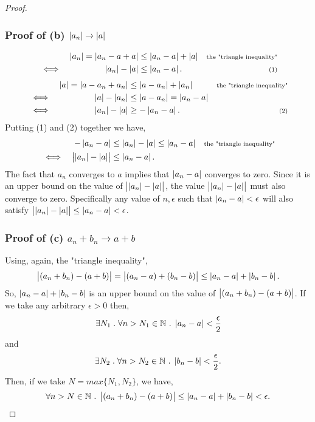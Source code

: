 \documentclass[../MathsNotesBase.tex]{subfiles}
\begin{document}
{\begin{proof}
			\subsubsection{Proof of (b) $ \left\lvert a_n\right\rvert \to \left\lvert a\right\rvert $} 
			\begin{align*}
			&& \left\lvert a_n\right\rvert = \left\lvert a_n - a + a\right\rvert &\leq \left\lvert a_n - a\right\rvert + \left\lvert a\right\rvert  &\text{\scriptsize{the "triangle inequality"}}\\
			&\iff & \left\lvert a_n\right\rvert - \left\lvert a\right\rvert &\leq \left\lvert a_n - a\right\rvert. &\text{\scriptsize{(1)}} \\
			\end{align*}
			\begin{align*}
			&& \left\lvert a\right\rvert = \left\lvert a - a_n + a_n\right\rvert &\leq \left\lvert a - a_n\right\rvert + \left\lvert a_n\right\rvert  &\text{\scriptsize{the "triangle inequality"}}\\
			&\iff & \left\lvert a\right\rvert - \left\lvert a_n\right\rvert &\leq \left\lvert a - a_n\right\rvert = \left\lvert a_n - a\right\rvert &\text{\scriptsize{}} \\
			&\iff & \left\lvert a_n\right\rvert - \left\lvert a\right\rvert &\geq -\left\lvert a_n - a\right\rvert. &\text{\scriptsize{(2)}} \\
			\end{align*}
			Putting (1) and (2) together we have,
			\begin{align*}
			&& -\left\lvert a_n - a\right\rvert &\leq \left\lvert a_n\right\rvert - \left\lvert a\right\rvert \leq \left\lvert a_n - a\right\rvert &\text{\scriptsize{the "triangle inequality"}}\\
			&\iff & \left\lvert\left\lvert a_n\right\rvert - \left\lvert a\right\rvert\right\rvert &\leq \left\lvert a_n - a\right\rvert. \\
			\end{align*}
			The fact that $a_n$ converges to $a$ implies that $ \left\lvert a_n - a\right\rvert $ converges to zero. Since it is an upper bound on the value of ${ \left\lvert\left\lvert a_n\right\rvert - \left\lvert a\right\rvert\right\rvert }$, the value ${ \left\lvert\left\lvert a_n\right\rvert - \left\lvert a\right\rvert\right\rvert }$ must also converge to zero. Specifically any value of $ n, \epsilon $ such that ${ \left\lvert a_n - a\right\rvert < \epsilon }$ will also satisfy ${ \left\lvert\left\lvert a_n\right\rvert - \left\lvert a\right\rvert\right\rvert \leq \left\lvert a_n - a\right\rvert < \epsilon }$.
			
			\subsubsection{Proof of (c) $ a_n + b_n \to a + b $}
			Using, again, the "triangle inequality",
			\[ \left\lvert(a_n + b_n) - (a + b)\right\rvert = \left\lvert(a_n - a) + (b_n - b)\right\rvert \leq \left\lvert a_n - a\right\rvert + \left\lvert b_n - b\right\rvert. \]
			So, ${ \left\lvert a_n - a\right\rvert + \left\lvert b_n - b\right\rvert }$ is an upper bound on the value of ${ \left\lvert(a_n + b_n) - (a + b)\right\rvert }$. If we take any arbitrary ${ \epsilon > 0 }$ then,
			\[ \exists N_1 \;.\; \forall n > N_1 \in \mathbb{N}^{} \;.\; \left\lvert a_n - a\right\rvert < \frac{\epsilon}{2} \]
			and
			\[ \exists N_2 \;.\; \forall n > N_2 \in \mathbb{N}^{} \;.\; \left\lvert b_n - b\right\rvert < \frac{\epsilon}{2}. \]
			Then, if we take $ N = max\{N_1, N_2\} $, we have,
			\[ \forall n > N \in \mathbb{N}^{} \;.\; \left\lvert(a_n + b_n) - (a + b)\right\rvert \leq \left\lvert a_n - a\right\rvert + \left\lvert b_n - b\right\rvert < \epsilon. \]
			

\end{proof}}
\end{document}
